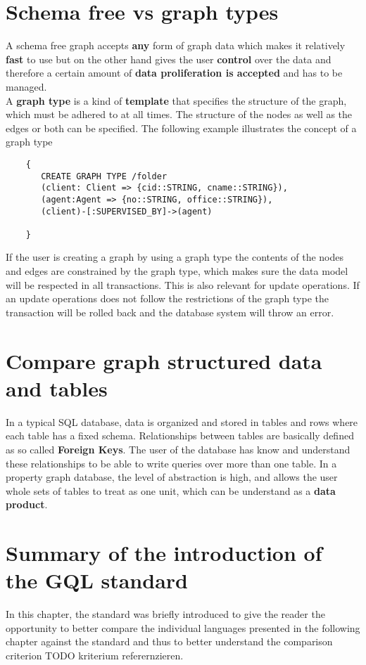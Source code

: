 \section{Schema free vs graph types}
A schema free graph accepts \textbf{any} form of graph data which makes it relatively \textbf{fast} to use 
but on the other hand gives the user \textbf{control} over the data 
and therefore a certain amount of \textbf{data proliferation is accepted} and has to be managed.\\
A \textbf{graph type} is a kind of \textbf{template} that specifies the structure of the graph, which must be adhered to at all times.
The structure of the nodes as well as the edges or both can be specified.
The following example illustrates the concept of a graph type
\begin{lstlisting}
    {
       CREATE GRAPH TYPE /folder
       (client: Client => {cid::STRING, cname::STRING}),
       (agent:Agent => {no::STRING, office::STRING}),
       (client)-[:SUPERVISED_BY]->(agent)

    }
\end{lstlisting}
If the user is creating a graph by using a graph type the contents of the nodes and edges 
are constrained by the graph type, which makes sure the data model will be respected in 
all transactions. This is also relevant for update operations. If an update operations does 
not follow the restrictions of the graph type the transaction will be rolled back and 
the database system will throw an error.
\section{Compare graph structured data and tables}
In a typical SQL database, data is organized and stored in tables and rows where each 
table has a fixed schema.\newline
Relationships between tables are basically defined as so called \textbf{Foreign Keys}.
The user of the database has know and understand these relationships to be able
to write queries over more than one table.\newline
In a property graph database, the level of abstraction is high, and allows the user 
whole sets of tables to treat as one unit, which can be understand as a \textbf{data product}.
\section{Summary of the introduction of the GQL standard}
In this chapter, the standard was briefly introduced to give the reader the opportunity to better compare 
the individual languages presented in the following chapter against the standard 
and thus to better understand the comparison criterion TODO kriterium referernzieren.

